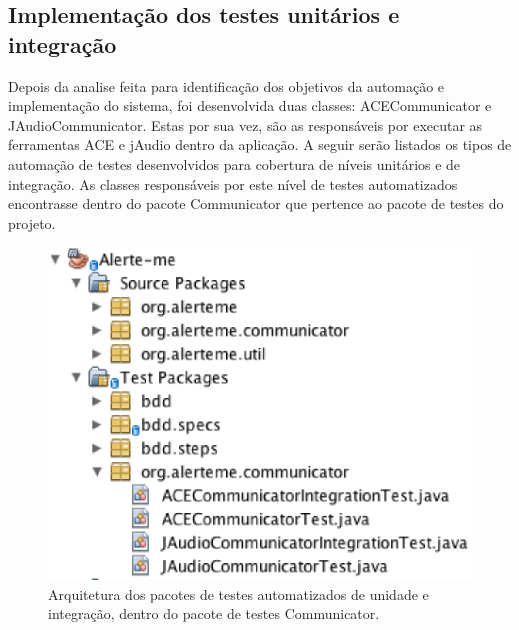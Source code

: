 \subsection{Implementação dos testes unitários e integração}

Depois da analise feita para identificação dos objetivos da automação e implementação do sistema, foi desenvolvida duas classes: ACECommunicator e JAudioCommunicator. Estas por sua vez, são as responsáveis por executar as ferramentas ACE e jAudio dentro da aplicação. A seguir serão listados os tipos de automação de testes desenvolvidos para cobertura de níveis unitários e de integração. As classes responsáveis por este nível de testes automatizados encontrasse dentro do pacote Communicator que pertence ao pacote de testes do projeto.  

\begin{figure}[H]
	\centering
	\captionsetup{justification=centering,margin=2cm}
	\includegraphics[scale=0.80]{capitulos/validacao/figuras/testesUnitEdIntegra.eps}
	\caption{Arquitetura dos pacotes de testes automatizados de unidade e integração, dentro do pacote de testes Communicator.}
	\label{fig:result-engajamento}
\end{figure}



